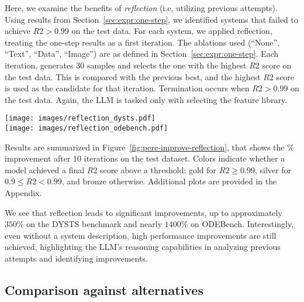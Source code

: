 \documentclass{article}
\begin{document}
Here, we examine the benefits of \textit{reflection} (i.e, utilizing previous attempts). 
Using results from Section~\ref{sec:expr:one-step}, we identified systems that failed to achieve $R2>0.99$ on the test data. 
For each system, we applied reflection, treating the one-step results as a first iteration. 
The ablations used (``None'', ``Text'', ``Data'', ``Image'') are as defined in Section~\ref{sec:expr:one-step}.
Each iteration, generates 30 samples and selects the one with the highest $R2$ score on the test data. 
This is compared with the previous best, and the highest $R2$ score is used as the candidate for that iteration.
Termination occurs when $R2>0.99$ on the test data. 
Again, the LLM is tasked only with selecting the feature library.

\begin{figure*}
    \texttt{[image: images/reflection\_dysts.pdf]}\\
    \texttt{[image: images/reflection\_odebench.pdf]}
    \caption{Percentage improvement in the $R2$ score after 10 iterations of reflection on the test dataset for the DYSTS (top row) and ODEBench (bottom row) benchmarks. Colors indicate whether the final $R2$ score is above a threshold. The numbers in $[\cdot]$ are the number of systems in this category.}
    \label{fig:perc-improve-reflection}
\end{figure*}

Results are summarized in Figure~\ref{fig:perc-improve-reflection}, that shows the $\%$ improvement after 10 iterations on the test dataset. 
Colors indicate whether a model achieved a final $R2$ score above a threshold: gold for $R2 \geq 0.99$, silver for $0.9 \leq R2 < 0.99$, and bronze otherwise. 
Additional plots are provided in the Appendix.

We see that reflection leads to significant improvements, up to approximately $350\%$ on the DYSTS benchmark and nearly $1400\%$ on ODEBench. 
Interestingly, even without a system description, high performance improvements are still achieved, highlighting the LLM's reasoning capabilities in analyzing previous attempts and identifying improvements.

\subsection{Comparison against alternatives}
\end{document}

